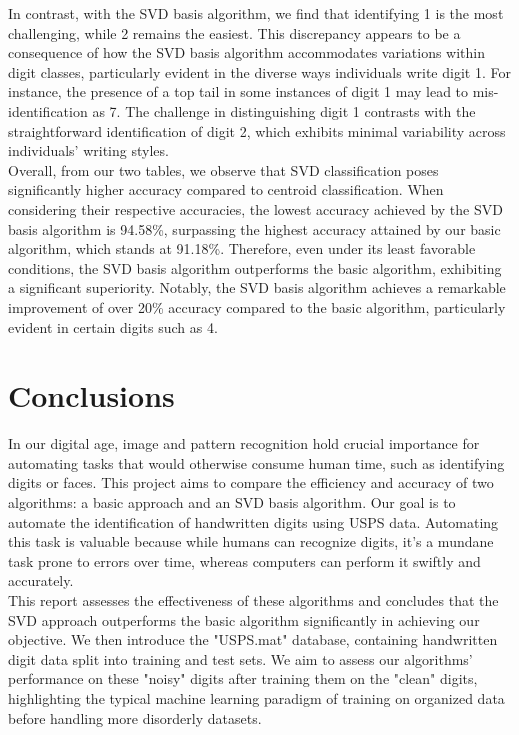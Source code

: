 \documentclass{article} %
\begin{document}
  \noindent In contrast, with the SVD basis algorithm, we find that identifying 1 is the most challenging, while 2 remains the easiest. This discrepancy appears to be a consequence of how the SVD basis algorithm accommodates variations within digit classes, particularly evident in the diverse ways individuals write digit 1. For instance, the presence of a top tail in some instances of digit 1 may lead to mis-identification as 7. The challenge in distinguishing digit 1 contrasts with the straightforward identification of digit 2, which exhibits minimal variability across individuals' writing styles. \\

  \noindent Overall, from our two tables, we observe that SVD classification poses significantly higher accuracy compared to centroid classification. When considering their respective accuracies, the lowest accuracy achieved by the SVD basis algorithm is 94.58\%, surpassing the highest accuracy attained by our basic algorithm, which stands at 91.18\%. Therefore, even under its least favorable conditions, the SVD basis algorithm outperforms the basic algorithm, exhibiting a significant superiority. Notably, the SVD basis algorithm achieves a remarkable improvement of over 20\% accuracy compared to the basic algorithm, particularly evident in certain digits such as 4.

  \section{Conclusions}
  In our digital age, image and pattern recognition hold crucial importance for automating tasks that would otherwise consume human time, such as identifying digits or faces. This project aims to compare the efficiency and accuracy of two algorithms: a basic approach and an SVD basis algorithm. Our goal is to automate the identification of handwritten digits using USPS data. Automating this task is valuable because while humans can recognize digits, it's a mundane task prone to errors over time, whereas computers can perform it swiftly and accurately. \\
  
  \noindent This report assesses the effectiveness of these algorithms and concludes that the SVD approach outperforms the basic algorithm significantly in achieving our objective. We then introduce the "USPS.mat" database, containing handwritten digit data split into training and test sets. We aim to assess our algorithms' performance on these "noisy" digits after training them on the "clean" digits, highlighting the typical machine learning paradigm of training on organized data before handling more disorderly datasets. \\
\end{document}

